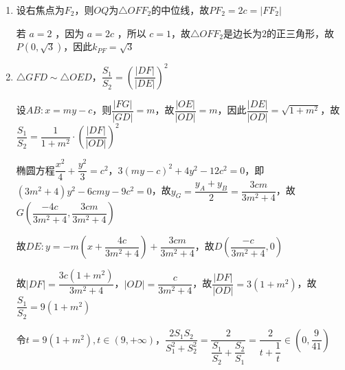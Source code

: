 \begin{enumerate}
\begin{enumerate}
\begin{jieda}
\begin{enumerate}
                \item 设右焦点为$F_2$，则$OQ$为$\triangle OFF_2$的中位线，故$PF_2 = 2c = |FF_2|$
                
                若 $a = 2$ ，因为 $a = 2c$ ，所以 $c = 1$，故$\triangle OFF_2$是边长为$2$的正三角形，故$P(0, \sqrt{3})$，因此$k_{PF} = \sqrt{3}$

                \item $\triangle GFD \sim \triangle OED$，$\dfrac{S_1}{S_2} = \left(\dfrac{|DF|}{|DE|}\right)^2$
                
                设$AB: x = my - c$，则$\dfrac{|FG|}{|GD|} = m$，故$\dfrac{|OE|}{|OD|} = m$，因此$\dfrac{|DE|}{|OD|} = \sqrt{1+m^2}$，故$\dfrac{S_1}{S_2} = \dfrac{1}{1+m^2} \cdot \left(\dfrac{|DF|}{|OD|}\right)^2$

                椭圆方程$\dfrac{x^2}{4}+\dfrac{y^2}{3} = c^2$，$3(my-c)^2+4y^2-12c^2 = 0$，即$(3m^2+4)y^2-6cmy-9c^2 = 0$，故$y_G = \dfrac{y_A+y_B}{2} = \dfrac{3cm}{3m^2+4}$，故$G\left(\dfrac{-4c}{3m^2+4}, \dfrac{3cm}{3m^2+4}\right)$
                
                故$DE: y = -m\left(x+\dfrac{4c}{3m^2+4}\right)+\dfrac{3cm}{3m^2+4}$，故$D\left(\dfrac{-c}{3m^2+4}, 0\right)$
                
                故$|DF| = \dfrac{3c(1+m^2)}{3m^2+4}$，$|OD| = \dfrac{c}{3m^2+4}$，故$\dfrac{|DF|}{|OD|} = 3(1+m^2)$，故$\dfrac{S_1}{S_2} = 9(1+m^2)$

                令$t = 9(1+m^2), t \in (9, +\infty)$，$\dfrac{2S_{1}S_2}{S_1^2 + S_2^2} = \dfrac{2}{\dfrac{S_1}{S_2} + \dfrac{S_2}{S_1}} = \dfrac{2}{t+\dfrac{1}{t}} \in \left(0, \dfrac{9}{41}\right)$
            \end{enumerate}
        \end{jieda}


\end{enumerate}
\end{enumerate}
